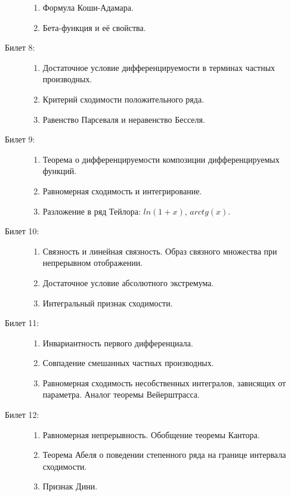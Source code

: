\documentclass{article}
\begin{document}
\begin{description}
\begin{enumerate}
		\item Формула Коши-Адамара.
		\item Бета-функция и её свойства.
	\end{enumerate}
	\item[Билет 8:]\phantom{}
	\begin{enumerate}
		\item Достаточное условие дифференцируемости в терминах
		      частных производных.
		\item Критерий сходимости положительного ряда.
		\item Равенство Парсеваля и неравенство Бесселя.
	\end{enumerate}
	\item[Билет 9:]\phantom{}
	\begin{enumerate}
		\item Теорема о дифференцируемости композиции дифференцируемых
		      функций.
		\item Равномерная сходимость и интегрирование.
		\item Разложение в ряд Тейлора: $ln(1 + x)$, $arc tg(x)$.
	\end{enumerate}
	\item[Билет 10:]\phantom{}
	\begin{enumerate}
		\item Связность и линейная связность. Образ связного множества
		      при непрерывном отображении.
		\item Достаточное условие абсолютного экстремума.
		\item Интегральный признак сходимости.
	\end{enumerate}
	\item[Билет 11:]\phantom{}
	\begin{enumerate}
		\item Инвариантность первого дифференциала.
		\item Совпадение смешанных частных производных.
		\item Равномерная сходимость несобственных интегралов,
		      зависящих от параметра. Аналог теоремы Вейерштрасса.
	\end{enumerate}
	\item[Билет 12:]\phantom{}
	\begin{enumerate}
		\item Равномерная непрерывность. Обобщение теоремы Кантора.
		\item Теорема Абеля о поведении степенного ряда на границе
		      интервала сходимости.
		\item Признак Дини.
	\end{enumerate}
\end{description}
\end{document}
